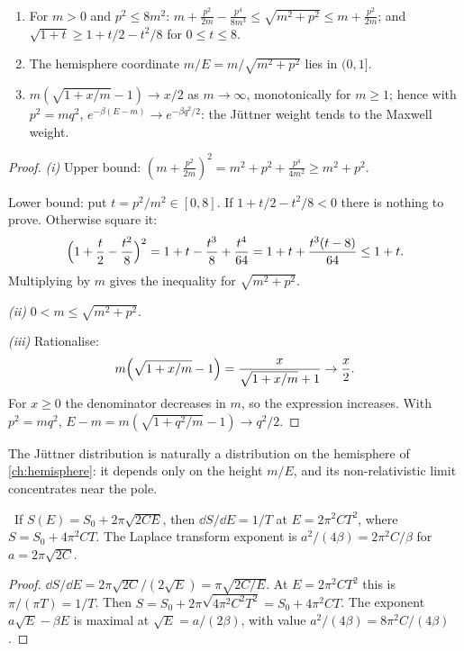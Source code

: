 \begin{proposition}\label{prop:juttner}\ver\
\begin{enumerate}[label=(\roman*)]
\item For $m>0$ and $p^2\le8m^2$: $m+\frac{p^2}{2m}-\frac{p^4}{8m^3}\le\sqrt{m^2+p^2}\le m+\frac{p^2}{2m}$; and $\sqrt{1+t}\ge1+t/2-t^2/8$ for $0\le t\le8$.
\item The hemisphere coordinate $m/E=m/\sqrt{m^2+p^2}$ lies in $(0,1]$.
\item $m(\sqrt{1+x/m}-1)\to x/2$ as $m\to\infty$, monotonically for $m\ge1$; hence with $p^2=mq^2$, $e^{-\beta(E-m)}\to e^{-\beta q^2/2}$: the J\"uttner weight tends to the Maxwell weight.
\end{enumerate}
\end{proposition}
\begin{proof}
\emph{(i)} Upper bound: $(m+\frac{p^2}{2m})^2=m^2+p^2+\frac{p^4}{4m^2}\ge m^2+p^2$.

Lower bound: put $t=p^2/m^2\in[0,8]$. If $1+t/2-t^2/8<0$ there is nothing to prove. Otherwise square it:
\[
\Bigl(1+\frac t2-\frac{t^2}8\Bigr)^2=1+t-\frac{t^3}8+\frac{t^4}{64}=1+t+\frac{t^3(t-8)}{64}\le1+t .
\]
Multiplying by $m$ gives the inequality for $\sqrt{m^2+p^2}$.

\emph{(ii)} $0<m\le\sqrt{m^2+p^2}$.

\emph{(iii)} Rationalise:
\[
m\Bigl(\sqrt{1+x/m}-1\Bigr)=\frac x{\sqrt{1+x/m}+1}\to\frac x2 .
\]
For $x\ge0$ the denominator decreases in $m$, so the expression increases. With $p^2=mq^2$, $E-m=m(\sqrt{1+q^2/m}-1)\to q^2/2$.
\end{proof}


The J\"uttner distribution is naturally a distribution on the hemisphere of \cref{ch:hemisphere}: it depends only on the height $m/E$, and its non-relativistic limit concentrates near the pole.

\begin{proposition}[A Cardy-type density of states]\label{prop:cardy}\ver\
If $S(E)=S_0+2\pi\sqrt{2CE}$, then $\dd S/\dd E=1/T$ at $E=2\pi^2CT^2$, where $S=S_0+4\pi^2CT$. The Laplace transform exponent is $a^2/(4\beta)=2\pi^2C/\beta$ for $a=2\pi\sqrt{2C}$.
\end{proposition}
\begin{proof}
$\dd S/\dd E=2\pi\sqrt{2C}/(2\sqrt E)=\pi\sqrt{2C/E}$. At $E=2\pi^2CT^2$ this is $\pi/(\pi T)=1/T$. Then $S=S_0+2\pi\sqrt{4\pi^2C^2T^2}=S_0+4\pi^2CT$. The exponent $a\sqrt E-\beta E$ is maximal at $\sqrt E=a/(2\beta)$, with value $a^2/(4\beta)=8\pi^2C/(4\beta)$.
\end{proof}


